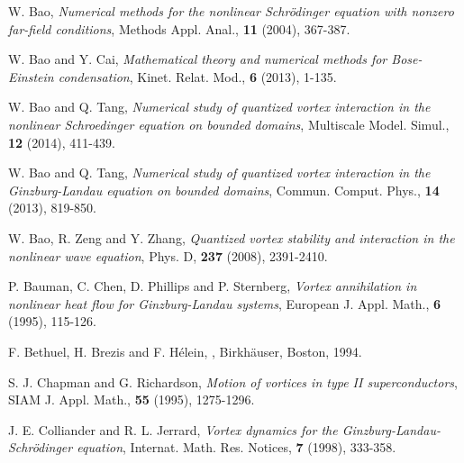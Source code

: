 \documentclass{aims}
\theoremstyle{plain}
\theoremstyle{definition}
\begin{document}




\begin{thebibliography}{99}

\newblock W. Bao,
\newblock \emph{Numerical methods for the nonlinear Schr\"odinger equation with nonzero far-field conditions},
\newblock Methods Appl. Anal., \textbf {11} (2004), 367-387.

\newblock W. Bao and Y. Cai,
\newblock \emph{Mathematical theory and numerical methods for Bose-Einstein condensation},
\newblock Kinet. Relat. Mod., \textbf{6} (2013), 1-135.

\newblock W. Bao and Q. Tang,
\newblock \emph{Numerical study of quantized vortex interaction in the nonlinear Schroedinger equation on bounded domains},
\newblock Multiscale Model. Simul.,
\textbf{12} (2014),  411-439.

\newblock W. Bao and Q. Tang,
\newblock \emph{Numerical study of quantized vortex interaction in the Ginzburg-Landau equation on bounded domains},
\newblock Commun. Comput. Phys., \textbf{14} (2013), 819-850.

\newblock W. Bao,  R. Zeng and Y. Zhang,
\newblock \emph{Quantized vortex stability and interaction in the nonlinear wave equation},
\newblock Phys. D, \textbf{237} (2008), 2391-2410.

\newblock P. Bauman, C. Chen, D. Phillips and P. Sternberg,
\newblock \emph{Vortex annihilation in nonlinear heat flow for Ginzburg-Landau systems},
\newblock European J. Appl. Math., \textbf {6} (1995), 115-126.

\newblock F. Bethuel, H. Brezis and F. H\'elein,
\newblock {},
\newblock Birkh\"auser, Boston, 1994.

\newblock S. J. Chapman and G. Richardson,
\newblock \emph{Motion of vortices in type II superconductors},
\newblock SIAM J. Appl. Math., \textbf {55} (1995), 1275-1296.

\newblock J. E. Colliander and R. L. Jerrard,
\newblock \emph{Vortex dynamics for the Ginzburg-Landau-Schr\"odinger equation},
\newblock Internat. Math. Res. Notices, \textbf {7} (1998), 333-358.


\end{thebibliography}
\end{document}
